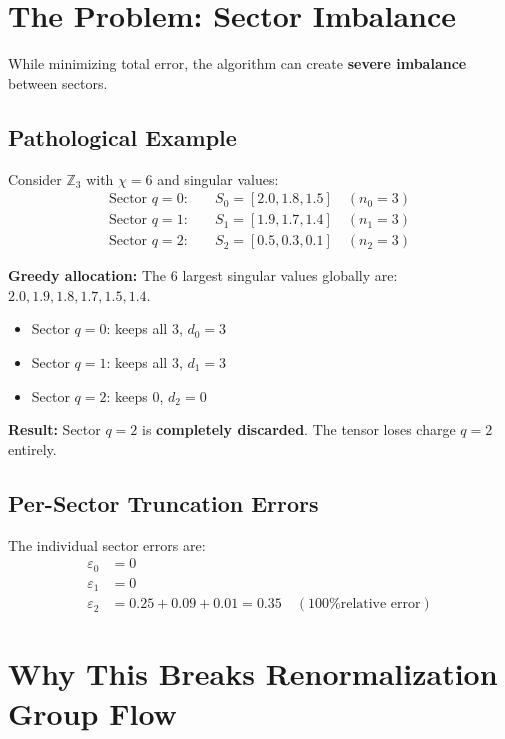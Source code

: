 \documentclass{article}
\begin{document}
\section{The Problem: Sector Imbalance}

While minimizing total error, the algorithm can create \textbf{severe imbalance} between sectors.

\subsection{Pathological Example}

Consider $\mathbb{Z}_3$ with $\chi = 6$ and singular values:
\begin{align}
    \text{Sector } q=0: & \quad S_0 = [2.0, 1.8, 1.5] \quad (n_0 = 3) \\
    \text{Sector } q=1: & \quad S_1 = [1.9, 1.7, 1.4] \quad (n_1 = 3) \\
    \text{Sector } q=2: & \quad S_2 = [0.5, 0.3, 0.1] \quad (n_2 = 3)
\end{align}

\textbf{Greedy allocation:}
The 6 largest singular values globally are: $2.0, 1.9, 1.8, 1.7, 1.5, 1.4$.
\begin{itemize}
    \item Sector $q=0$: keeps all 3, $d_0 = 3$
    \item Sector $q=1$: keeps all 3, $d_1 = 3$
    \item Sector $q=2$: keeps 0, $d_2 = 0$
\end{itemize}

\textbf{Result:} Sector $q=2$ is \textbf{completely discarded}. The tensor loses charge $q=2$ entirely.

\subsection{Per-Sector Truncation Errors}

The individual sector errors are:
\begin{align}
    \varepsilon_0 &= 0 \\
    \varepsilon_1 &= 0 \\
    \varepsilon_2 &= 0.25 + 0.09 + 0.01 = 0.35 \quad (\text{100\% relative error})
\end{align}

\section{Why This Breaks Renormalization Group Flow}
\end{document}
